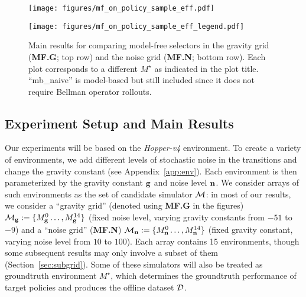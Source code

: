 \begin{figure*}[htbp]
    \centering
    \begin{minipage}{0.66\textwidth}
        \texttt{[image: figures/mf\_on\_policy\_sample\_eff.pdf]}
    \end{minipage}%
    \begin{minipage}{0.34\textwidth}
%
%
                \texttt{[image: figures/mf\_on\_policy\_sample\_eff\_legend.pdf]}
                \caption{Main results for comparing  model-free selectors in the gravity grid (\textbf{MF.G}; top row) and the noise grid (\textbf{MF.N}; bottom row). Each plot corresponds to a different $M^\star$ as indicated in the plot title. %
                ``mb\_naive'' is model-based but still included since it does not require Bellman operator rollouts. %
                \label{fig:mainfigure} 
                }
%
%
%
%
%
%
%
%
    \end{minipage}
\end{figure*}

\subsection{Experiment Setup and Main Results}
\label{sec:exp-main}
%
Our  experiments will be based on the \textit{Hopper-v4} environment. To create a variety of environments, we  add different levels of stochastic noise in the transitions and change the gravity constant (see Appendix~\ref{app:env}). Each environment is then parameterized by the gravity constant $\mathbf{g}$ and noise level $\mathbf{n}$. We consider arrays of such environments as the set of candidate simulator $\mathcal{M}$: in most of our results, we consider a ``gravity grid'' (denoted using \textbf{MF.G} in the figures) $\mathcal{M}_{\mathbf{g}} := \{M_{\mathbf{g}}^{0} \ldots, M_{\mathbf{g}}^{14}\}$ (fixed noise level, varying gravity constants from $-51$ to $-9$) and a ``noise grid'' (\textbf{MF.N}) $\mathcal{M}_{\mathbf{n}} := \{M_{\mathbf{n}}^{0} \ldots, M_{\mathbf{n}}^{14}\}$ (fixed gravity constant, varying noise level from $10$ to $100$). Each array contains 15 environments, though some subsequent results may only involve a subset of them (Section~\ref{sec:subgrid}). %
Some of these simulators will also be treated as groundtruth environment $M^\star$, which determines the groundtruth performance of target policies  and produces the offline dataset $\mathcal{D}$. 

